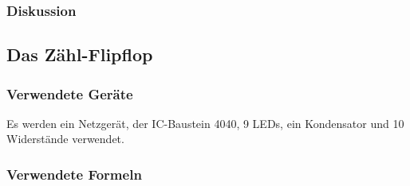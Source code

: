 \documentclass[12pt,a4paper]{article}
\begin{document}
\subsubsection*{Diskussion}

\subsection{Das Zähl-Flipflop}
\subsubsection*{Verwendete Geräte}
Es werden ein Netzgerät, der IC-Baustein 4040, 9 LEDs, ein Kondensator und 10 Widerstände verwendet.
\subsubsection*{Verwendete Formeln}
\end{document}
